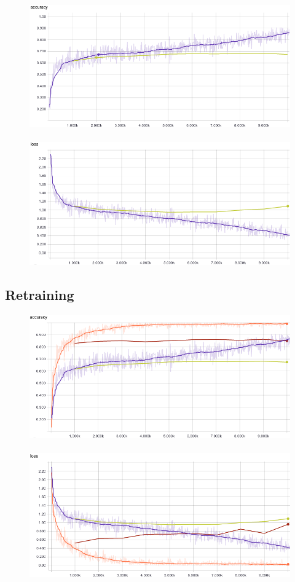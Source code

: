 \documentclass{article}
\begin{document}
\begin{figure}[h!]
\centering
\includegraphics[width=12.2cm]{acc-transfer.png}\	
\includegraphics[width=12.2cm]{loss-transfer.png}
\caption{}
\label{fig:extra}
\end{figure}




\subsection{Retraining}

\begin{figure}[h!]
\centering
\includegraphics[width=12.2cm]{acc-retrain.png}\	
\includegraphics[width=12.2cm]{loss-retrain.png}
\caption{}
\label{fig:retrain}
\end{figure}
\end{document}
